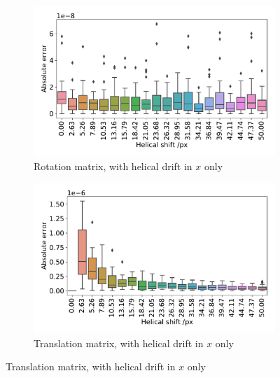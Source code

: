 \documentclass{osa-article}
\begin{document}
\begin{figure}
\begin{subfigure}[t]{0.5\linewidth}
    \captionsetup{width=0.8\linewidth}
    \centering
    \includegraphics[width=\linewidth]{./figures/results/helix/decompose/improved/10082020_bead_simulation_tx_ROT_err}
    \caption{Rotation matrix, with helical drift in \(x\) only}\label{fig:pc_sum_rot_tx}
  \end{subfigure}\hfill
  \begin{subfigure}[t]{0.5\linewidth}
    \captionsetup{width=0.8\linewidth}
    \centering
    \includegraphics[width=\linewidth]{./figures/results/helix/decompose/improved/10082020_bead_simulation_tx_TRANS_err}
    \caption{Translation matrix, with helical drift in \(x\) only}\label{fig:pc_sum_trans_tx}
  \end{subfigure}
  \bigskip

\end{figure}
\end{document}
